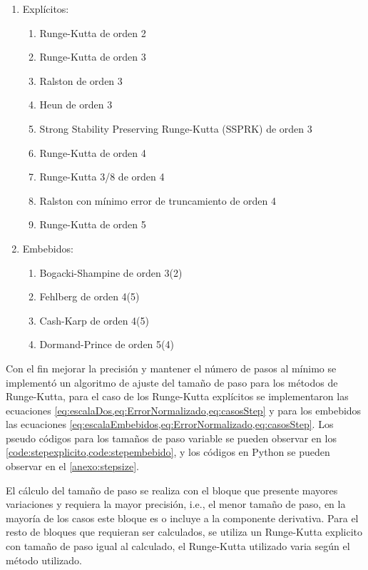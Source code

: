        \begin{enumerate}[leftmargin=\parindent]
            \item Explícitos:
                \begin{enumerate}
                    \item Runge-Kutta de orden 2
                    \item Runge-Kutta de orden 3
                    \item Ralston de orden 3
                    \item Heun de orden 3
                    \item Strong Stability Preserving Runge-Kutta (SSPRK) de orden 3
                    \item Runge-Kutta de orden 4
                    \item Runge-Kutta 3/8 de orden 4
                    \item Ralston con mínimo error de truncamiento de orden 4
                    \item Runge-Kutta de orden 5
                \end{enumerate}
            \item Embebidos:
                \begin{enumerate}
                    \item Bogacki-Shampine de orden 3(2)
                    \item Fehlberg de orden 4(5)
                    \item Cash-Karp de orden 4(5)
                    \item Dormand-Prince de orden 5(4)
                \end{enumerate}
        \end{enumerate}

        Con el fin mejorar la precisión y mantener el número de pasos al mínimo se implementó un algoritmo de ajuste del tamaño de paso para los métodos de Runge-Kutta, para el caso de los Runge-Kutta explícitos se implementaron las ecuaciones \cref{eq:escalaDos,eq:ErrorNormalizado,eq:casosStep} y para los embebidos las ecuaciones \cref{eq:escalaEmbebidos,eq:ErrorNormalizado,eq:casosStep}. Los pseudo códigos para los tamaños de paso variable se pueden observar en los \cref{code:stepexplicito,code:stepembebido}, y los códigos en Python se pueden observar en el \ref{anexo:stepsize}.

        El cálculo del tamaño de paso se realiza con el bloque que presente mayores variaciones y requiera la mayor precisión, i.e., el menor tamaño de paso, en la mayoría de los casos este bloque es o incluye a la componente derivativa. Para el resto de bloques que requieran ser calculados, se utiliza un Runge-Kutta explicito con tamaño de paso igual al calculado, el Runge-Kutta utilizado varia según el método utilizado.

